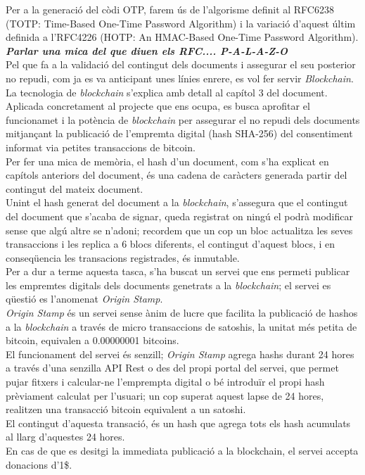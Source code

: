 Per a la generació del còdi OTP, farem ús de l'algorisme definit al RFC6238 (TOTP: Time-Based One-Time Password Algorithm) i la variació d'aquest últim definida a l'RFC4226 (HOTP: An HMAC-Based One-Time Password Algorithm).\\
\newline \textbf{\textit{Parlar una mica del que diuen els RFC.... P-A-L-A-Z-O}}\\
\newline Pel que fa a la validació del contingut dels documents i assegurar el seu posterior no repudi, com ja es va anticipant unes línies enrere, es vol fer servir \textit{Blockchain}.\\
La tecnologia de \textit{blockchain} s'explica amb detall al capítol 3 del document.\\
\newline Aplicada concretament al projecte que ens ocupa, es busca aprofitar el funcionamet i la potència de \textit{blockchain} per assegurar el no repudi dels documents mitjançant la publicació de l'empremta digital (hash SHA-256) del consentiment informat via petites transaccions de bitcoin.\\
Per fer una mica de memòria, el hash d'un document, com s'ha explicat en capítols anteriors del document, és una cadena de caràcters generada partir del contingut del mateix document.\\
Unint el hash generat del document a la \textit{blockchain}, s'assegura que el contingut del document que s'acaba de signar, queda registrat on ningú el podrà modificar sense que algú altre se n'adoni; recordem que un cop un bloc actualitza les seves transaccions i les replica a 6 blocs diferents, el contingut d'aquest blocs, i en conseqüencia les transacions registrades, és inmutable.\\
Per a dur a terme aquesta tasca, s'ha buscat un servei que ens permeti publicar les empremtes digitals dels documents genetrats a la \textit{blockchain}; el servei es qüestió es l'anomenat \textit{Origin Stamp}.\\
\textit{Origin Stamp} és un servei sense ànim de lucre que facilita la publicació de hashos a la \textit{blockchain} a través de micro transaccions de satoshis, la unitat més petita de bitcoin, equivalen a 0.00000001 bitcoins.\\
El funcionament del servei és senzill; \textit{Origin Stamp} agrega hashs durant 24 hores a través d'una senzilla API Rest o des del propi portal del servei, que permet pujar fitxers i calcular-ne l'emprempta digital o bé introduïr el propi hash prèviament calculat per l'usuari; un cop superat aquest lapse de 24 hores, realitzen una transacció bitcoin equivalent a un satoshi.\\
El contingut d'aquesta transació, és un hash que agrega tots els hash acumulats al llarg d'aquestes 24 hores.\\
En cas de que es desitgi la immediata publicació a la blockchain, el servei accepta donacions d'1\$.
